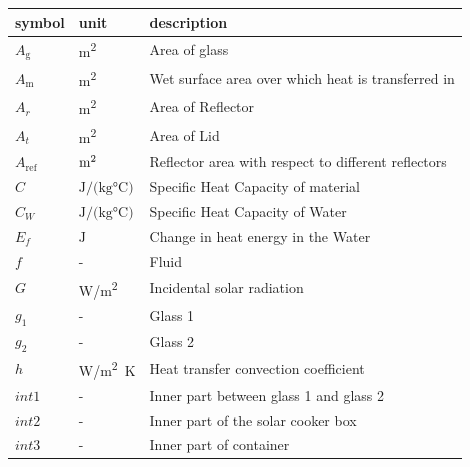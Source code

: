 \documentclass[12pt]{article}
\begin{document}
\renewcommand{\arraystretch}{1.2}
\noindent \begin{longtable*}{l l p{12cm}} \toprule
\textbf{symbol} & \textbf{unit} & \textbf{description}\\
\midrule 

$A_\text{g}$ & \si[per-mode=symbol] {\square\metre} & Area of glass
\\ 

$A_\text{m}$ & \si[per-mode=symbol] {\square\metre} & Wet surface area over which heat is transferred in
\\ 

$A_r$ & \si[per-mode=symbol] {\square\metre} & Area of Reflector
\\

$A_t$ & \si[per-mode=symbol] {\square\metre} & Area of Lid 
\\


$A_\text{ref}$ & $\si[per-mode=symbol] {\square\metre} $ & Reflector area with respect to different reflectors \\

$C$ & $\si{\joule\per(\kilogram \celsius)}$ & Specific Heat Capacity of material \\

$C_W$ & $\si{\joule\per(\kilogram \celsius)}$ & Specific Heat Capacity of Water \\

$E_f$ & $\si{\joule}$ & Change in heat energy in the Water \\

$f$ & - & Fluid \\

$G$ & \si[per-mode=symbol]{\watt\per\square\metre} & Incidental solar radiation \\

$g_1$ & - & Glass 1\\

$g_2$ & - & Glass 2 \\

$h$ & \si[per-mode=symbol]{\watt\per\square\metre K} & Heat transfer convection coefficient \\

$int1$ & - & Inner part between glass 1 and glass 2 \\

$int2$ & - & Inner part of the solar cooker box \\

$int3$ & - & Inner part of container \\


\end{longtable*}
\end{document}
